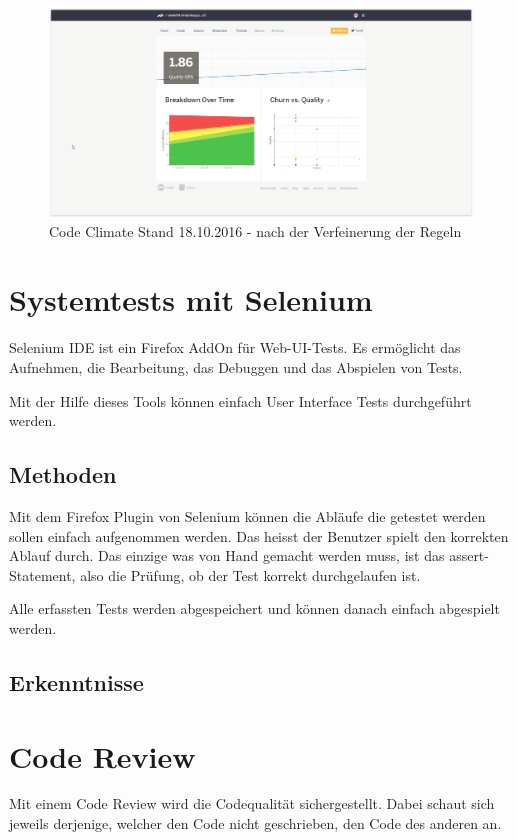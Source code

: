 \begin{figure}[H]
	\centering
	\includegraphics[width=1\textwidth
	]{Images/Stand_Beginn_181016.PNG}
	\caption{Code Climate Stand 18.10.2016 - nach der Verfeinerung der Regeln}
\end{figure}


\section{Systemtests mit Selenium}
Selenium IDE ist ein Firefox AddOn für Web-\acrfull{UI}-Tests. Es ermöglicht das Aufnehmen, die Bearbeitung, das Debuggen und das Abspielen von Tests. 

Mit der Hilfe dieses Tools können einfach \gls{User Interface} Tests durchgeführt werden.

\subsection{Methoden}
Mit dem Firefox Plugin von Selenium können die Abläufe die getestet werden sollen einfach aufgenommen werden. Das heisst der Benutzer spielt den korrekten Ablauf durch. Das einzige was von Hand gemacht werden muss, ist das assert-Statement, also die Prüfung, ob der Test korrekt durchgelaufen ist.

Alle erfassten Tests werden abgespeichert und können danach einfach abgespielt werden.

\subsection{Erkenntnisse}

\section{Code Review}
Mit einem Code Review wird die Codequalität sichergestellt. Dabei schaut sich jeweils derjenige, welcher den Code nicht geschrieben, den Code des anderen an. 


